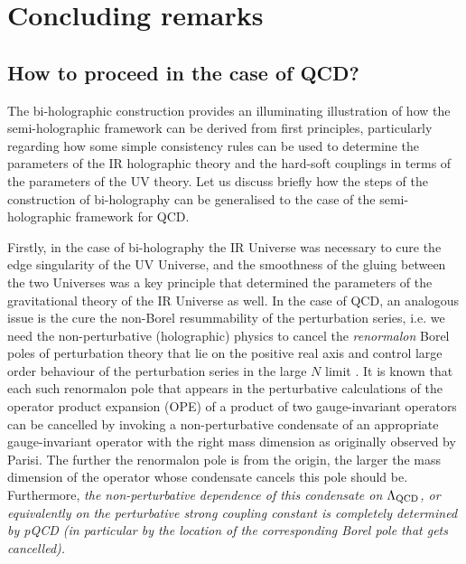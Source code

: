 \documentclass[prd,reprint,a4paper,showpacs,superscriptaddress,11pt,onecolumn,nofootinbib]{revtex4-1}
\renewcommand{\(}{\left(}
\renewcommand{\)}{\right)}
\newcommand{\6}{\partial}
\begin{document}
\section{Concluding remarks}\label{sec:outlook}
\subsection{How to proceed in the case of QCD?}
The bi-holographic construction provides an illuminating illustration of how the semi-holographic framework can be derived from first principles, particularly regarding how some simple consistency rules can be used to determine the parameters of the IR holographic theory and the hard-soft couplings in terms of the parameters of the UV theory. Let us discuss briefly how the steps of the construction of bi-holography can be generalised  to the case of the semi-holographic framework for QCD.

Firstly, in the case of bi-holography the IR Universe was necessary to cure the edge singularity of the UV Universe, and the smoothness of the gluing between the two Universes was a key principle that determined the parameters of the gravitational theory of the IR Universe as well. In the case of QCD, an analogous issue is the cure the non-Borel resummability of the perturbation series, i.e. we need the non-perturbative (holographic) physics to cancel the \textit{renormalon} Borel poles of perturbation theory that lie on the positive real axis and control large order behaviour of the perturbation series in the large $N$ limit \cite{Beneke:1998ui,citeulike:9712091}. It is known that each such renormalon pole that appears in the perturbative calculations of the operator product expansion (OPE) of a product of two gauge-invariant operators can be cancelled by invoking a non-perturbative condensate of an appropriate gauge-invariant operator with the right mass dimension \cite{Parisi:1978bj,citeulike:9712091} as originally observed by Parisi. The further the renormalon pole is from the origin, the larger the mass dimension of the operator whose condensate cancels this pole should be. Furthermore, \textit{the non-perturbative dependence of this condensate on $\Lambda_{\rm QCD}$, or equivalently on the perturbative strong coupling constant is completely determined by pQCD (in particular by the location of the corresponding Borel pole that gets cancelled).}  
\end{document}
